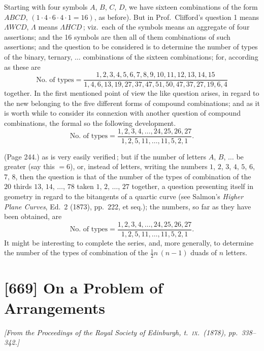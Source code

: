 \documentclass[11pt,a4paper]{article}
\theoremstyle{plain}
\theoremstyle{definition}
\begin{document}
Starting with four symbols $A$, $B$, $C$, $D$, we have sixteen combinations of the form $ABCD$, $(1\cdot 4\cdot 6\cdot 4\cdot 1 = 16)$, as before). But in Prof.\ Clifford's question 1 means $\Lambda WCD$, $\Lambda$ means $\Lambda HCD$\,; viz.\ each of the symbols means an aggregate of four assertions; and the 16 symbols are then all of them combinations of such assertions; and the question to be considered is to determine the number of types of the binary, ternary, $\ldots$ combinations of the sixteen combinations; for, according as these are
\[
\text{No.\ of types} = \frac{1, 2, 3, 4, 5, 6, 7, 8, 9, 10, 11, 12, 13, 14, 15}{1, 4, 6, 13, 19, 27, 37, 47, 51, 50, 47, 37, 27, 19, 6, 4}
\]
together. In the first mentioned point of view the like question arises, in regard to the new belonging to the five different forms of compound combinations; and as it is worth while to consider its connexion with another question of compound combinations, the formal so the following development.
\[
\text{No.\ of types} = \frac{1, 2, 3, 4, \ldots, 24, 25, 26, 27}{1, 2, 5, 11, \ldots, 11, 5, 2, 1}.
\]

\medskip

\noindent (Page 244.) as is very easily verified\,; but if the number of letters $A$, $B$, $\ldots$ be greater (say this $= 6$), or, instead of letters, writing the numbers $1$, $2$, $3$, $4$, $5$, $6$, $7$, $8$, then the question is that of the number of the types of combination of the $20$ thirds $13$, $14$, $\ldots$, $78$ taken $1$, $2$, $\ldots$, $27$ together, a question presenting itself in geometry in regard to the bitangents of a quartic curve (see Salmon's \emph{Higher Plane Curves}, Ed.\ 2 (1873), pp.\ 222, et seq.); the numbers, so far as they have been obtained, are
\[
\text{No.\ of types} = \frac{1, 2, 3, 4, \ldots, 24, 25, 26, 27}{1, 2, 5, 11, \ldots, 11, 5, 2, 1}.
\]
It might be interesting to complete the series, and, more generally, to determine the number of the types of combination of the $\tfrac{1}{2}n\,(n - 1)$ duads of $n$ letters.

\bigskip

\section{[669] On a Problem of Arrangements}
\label{sec:669}

\noindent\textit{[From the \emph{Proceedings of the Royal Society of Edinburgh}, t.~\textsc{ix.}\ (1878), pp.~338--342.]}
\end{document}

